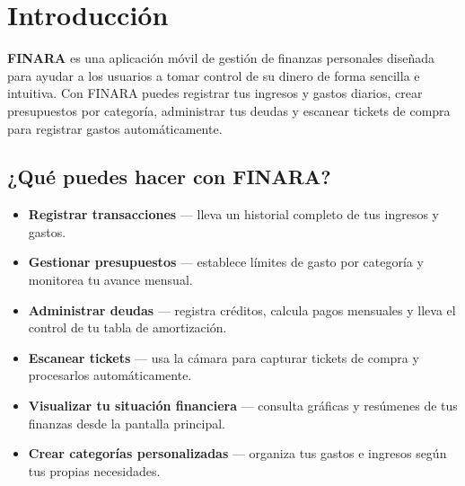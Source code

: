 \documentclass[a4paper,12pt]{report}
\begin{document}

\tableofcontents
\newpage

\listoffigures
{}
\newpage

\listoftables
{}
\newpage



\chapter{Introducción}

\textbf{FINARA} es una aplicación móvil de gestión de finanzas personales
diseñada para ayudar a los usuarios a tomar control de su dinero de forma
sencilla e intuitiva. Con FINARA puedes registrar tus ingresos y gastos
diarios, crear presupuestos por categoría, administrar tus deudas y
escanear tickets de compra para registrar gastos automáticamente.

\section{¿Qué puedes hacer con FINARA?}

\begin{itemize}
  \item \textbf{Registrar transacciones} — lleva un historial completo
        de tus ingresos y gastos.
  \item \textbf{Gestionar presupuestos} — establece límites de gasto por
        categoría y monitorea tu avance mensual.
  \item \textbf{Administrar deudas} — registra créditos, calcula pagos
        mensuales y lleva el control de tu tabla de amortización.
  \item \textbf{Escanear tickets} — usa la cámara para capturar tickets
        de compra y procesarlos automáticamente.
  \item \textbf{Visualizar tu situación financiera} — consulta gráficas
        y resúmenes de tus finanzas desde la pantalla principal.
  \item \textbf{Crear categorías personalizadas} — organiza tus gastos e
        ingresos según tus propias necesidades.
\end{itemize}
\end{document}
